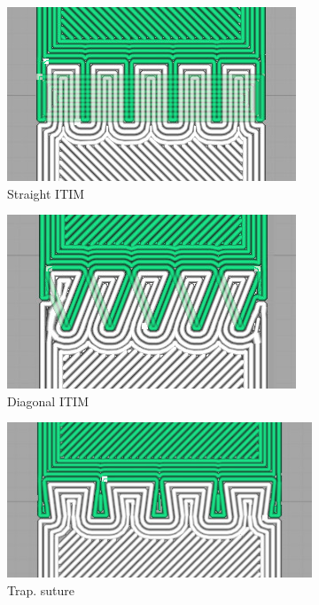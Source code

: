 \begin{figure}
	\setlength{\figheight}{.42\columnwidth}
	\centering
	\begin{subfigure}[B]{.26\columnwidth}
		\centering
		\includegraphics[width=\figheight,rotate=90]{sources-testing-straight_gcode.jpg}
		\caption{Straight ITIM}
		\label{interlocking:fig:gcode_straight}
	\end{subfigure}
	\begin{subfigure}[B]{.26\columnwidth}
		\centering
		\includegraphics[width=\figheight,rotate=90]{sources-testing-diagonal_gcode.jpg}
		\caption{Diagonal ITIM}
		\label{interlocking:fig:gcode_diagonal}
	\end{subfigure}
	\begin{subfigure}[B]{.22\columnwidth}
		\centering
		\includegraphics[width=\figheight,rotate=90]{sources-testing-suture_gcode.jpg}
		\caption{Trap. suture}
		\label{interlocking:fig:gcode_suture}
	\end{subfigure}
	\begin{subfigure}[B]{.22\columnwidth}

\end{subfigure}
\end{figure}
